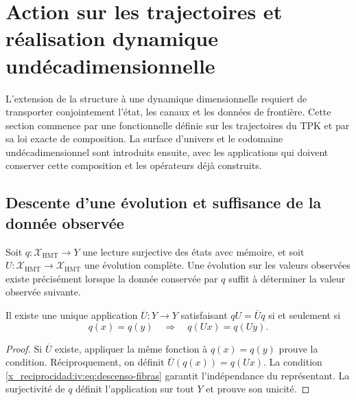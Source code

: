 \section{Action sur les trajectoires et réalisation dynamique undécadimensionnelle}
\label{x_reciprocidad:iv:accion-realizacion}

L’extension de la structure à une dynamique dimensionnelle requiert de
transporter conjointement l’état, les canaux et les données de
frontière. Cette section commence par une fonctionnelle définie sur
les trajectoires du TPK et par sa loi exacte de composition.
La surface d’univers et le codomaine undécadimensionnel sont
introduits ensuite, avec les applications qui doivent conserver cette
composition et les opérateurs déjà construits.

\subsection{Descente d’une évolution et suffisance de la donnée observée}

Soit \(q:\mathcal X_{\mathrm{HMT}}\to Y\) une lecture
surjective des états avec mémoire, et soit
\(U:\mathcal X_{\mathrm{HMT}}\to\mathcal X_{\mathrm{HMT}}\)
une évolution complète. Une évolution sur les valeurs
observées existe précisément lorsque la donnée conservée par
\(q\) suffit à déterminer la valeur observée suivante.

\begin{theorem}
\label{x_reciprocidad:iv:thm:descenso-fibras}
Il existe une unique application \(\overline U:Y\to Y\)
satisfaisant \(qU=\overline Uq\) si et seulement si
\begin{equation}
 q(x)=q(y)\quad\Longrightarrow\quad q(Ux)=q(Uy).
 \label{x_reciprocidad:iv:eq:descenso-fibras}
\end{equation}
\end{theorem}
\begin{proof}
Si \(\overline U\) existe, appliquer la même fonction à
\(q(x)=q(y)\) prouve la condition. Réciproquement, on
définit \(\overline U(q(x))=q(Ux)\). La condition
\eqref{x_reciprocidad:iv:eq:descenso-fibras} garantit l’indépendance du
représentant. La surjectivité de \(q\) définit
l’application sur tout \(Y\) et prouve son unicité.
\end{proof}

